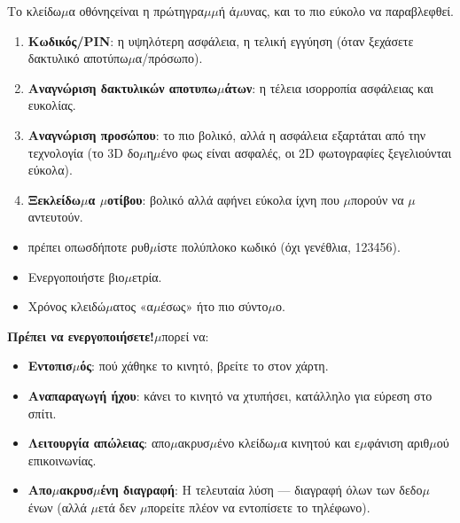 


Το κλείδω$\mu$α οθόνηςείναι η πρώτηγρα$\mu$$\mu$ή ά$\mu$υνας, και το πιο εύκολο να παραβλεφθεί.


\begin{enumerate}
  \item \textbf{Κωδικός/PIN}: η υψηλότερη ασφάλεια, η τελική εγγύηση (όταν ξεχάσετε δακτυλικό αποτύπω$\mu$α/πρόσωπο).
  \item \textbf{Αναγνώριση δακτυλικών αποτυπω$\mu$άτων}: η τέλεια ισορροπία ασφάλειας και ευκολίας.
  \item \textbf{Αναγνώριση προσώπου}: το πιο βολικό, αλλά η ασφάλεια εξαρτάται από την τεχνολογία (το 3D δο$\mu$η$\mu$ένο φως είναι ασφαλές, οι 2D φωτογραφίες ξεγελιούνται εύκολα).
  \item \textbf{Ξεκλείδω$\mu$α $\mu$οτίβου}: βολικό αλλά αφήνει εύκολα ίχνη που $\mu$πορούν να $\mu$αντευτούν.
\end{enumerate}


\begin{itemize}
  \item πρέπει οπωσδήποτε ρυθ$\mu$ίστε πολύπλοκο κωδικό (όχι γενέθλια, 123456).
  \item Ενεργοποιήστε βιο$\mu$ετρία.
  \item Χρόνος κλειδώ$\mu$ατος «α$\mu$έσως» ήτο πιο σύντο$\mu$ο.
\end{itemize}


\textbf{Πρέπει να ενεργοποιήσετε!}$\mu$πορεί να:

\begin{itemize}
  \item \textbf{Εντοπισ$\mu$ός}: πού χάθηκε το κινητό, βρείτε το στον χάρτη.
  \item \textbf{Αναπαραγωγή ήχου}: κάνει το κινητό να χτυπήσει, κατάλληλο για εύρεση στο σπίτι.
  \item \textbf{Λειτουργία απώλειας}: απο$\mu$ακρυσ$\mu$ένο κλείδω$\mu$α κινητού και ε$\mu$φάνιση αριθ$\mu$ού επικοινωνίας.
  \item \textbf{Απο$\mu$ακρυσ$\mu$ένη διαγραφή}: Η τελευταία λύση — διαγραφή όλων των δεδο$\mu$ένων (αλλά $\mu$ετά δεν $\mu$πορείτε πλέον να εντοπίσετε το τηλέφωνο).
\end{itemize}

